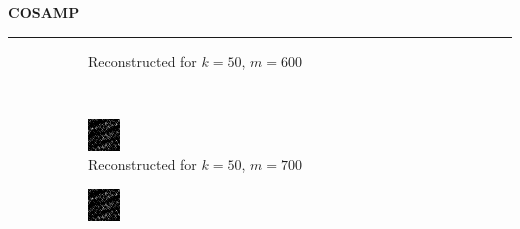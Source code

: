 \documentclass[a4paper,12pt]{article}
\newenvironment{solution}[2][]{%
    \begin{mdframed}[linecolor=blue!70!black, linewidth=2pt, roundcorner=10pt, backgroundcolor=yellow!10!white, skipabove=12pt, skipbelow=12pt]%
        \textbf{\large #2}
        \par\noindent\rule{\textwidth}{0.4pt}
}{
    \end{mdframed}
}
\begin{document}
\begin{solution}{COSAMP}
\begin{figure}[H]
\begin{subfigure}[t]{0.23\textwidth}
            \caption{Reconstructed for $k = 50$, $m = 600$}
        \end{subfigure}\\
        \begin{subfigure}[t]{0.23\textwidth}
            \centering
            \includegraphics[width=\textwidth]{../images/cosamp/Reconstructed_k_50_m_700.png}
            \caption{Reconstructed for $k = 50$, $m = 700$}
        \end{subfigure}
        \begin{subfigure}[t]{0.23\textwidth}
            \centering
            \includegraphics[width=\textwidth]{../images/cosamp/Reconstructed_k_50_m_800.png}

\end{subfigure}
\end{figure}
\end{solution}
\end{document}
